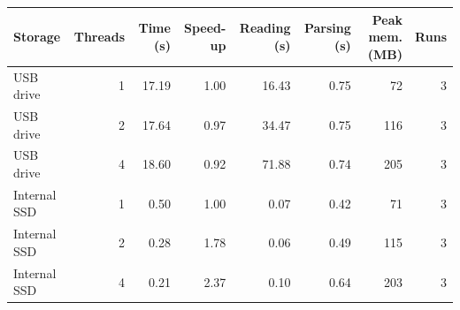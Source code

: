 \begin{tabular}{lrrrrrrr}
\toprule
Storage & Threads & Time (s) & Speed-up & Reading (s) & Parsing (s) & Peak mem. (MB) & Runs \\
\midrule
USB drive & 1 & 17.19 & 1.00 & 16.43 & 0.75 & 72 & 3 \\
USB drive & 2 & 17.64 & 0.97 & 34.47 & 0.75 & 116 & 3 \\
USB drive & 4 & 18.60 & 0.92 & 71.88 & 0.74 & 205 & 3 \\
Internal SSD & 1 & 0.50 & 1.00 & 0.07 & 0.42 & 71 & 3 \\
Internal SSD & 2 & 0.28 & 1.78 & 0.06 & 0.49 & 115 & 3 \\
Internal SSD & 4 & 0.21 & 2.37 & 0.10 & 0.64 & 203 & 3 \\
\bottomrule
\end{tabular}
